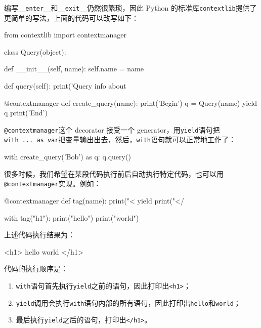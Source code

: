 编写\texttt{\_\_enter\_\_}和\texttt{\_\_exit\_\_}仍然很繁琐，因此 Python
的标准库\texttt{contextlib}提供了更简单的写法，上面的代码可以改写如下：

\begin{pythoncode}
from contextlib import contextmanager

class Query(object):

    def __init__(self, name):
        self.name = name

    def query(self):
        print('Query info about %

@contextmanager
def create_query(name):
    print('Begin')
    q = Query(name)
    yield q
    print('End')
\end{pythoncode}

\texttt{@contextmanager}这个 decorator 接受一个
generator，用\texttt{yield}语句把\texttt{with\ ...\ as\ var}把变量输出出去，然后，\texttt{with}语句就可以正常地工作了：

\begin{pythoncode}
with create_query('Bob') as q:
    q.query()
\end{pythoncode}

很多时候，我们希望在某段代码执行前后自动执行特定代码，也可以用\texttt{@contextmanager}实现。例如：

\begin{pythoncode}
@contextmanager
def tag(name):
    print("<%
    yield
    print("</%

with tag("h1"):
    print("hello")
    print("world")
\end{pythoncode}

上述代码执行结果为：

\begin{pythoncode}
<h1>
hello
world
</h1>
\end{pythoncode}

代码的执行顺序是：

\begin{enumerate}
\def\labelenumi{\arabic{enumi}.}
\item
  \texttt{with}语句首先执行\texttt{yield}之前的语句，因此打印出\texttt{\textless{}h1\textgreater{}}；
\item
  \texttt{yield}调用会执行\texttt{with}语句内部的所有语句，因此打印出\texttt{hello}和\texttt{world}；
\item
  最后执行\texttt{yield}之后的语句，打印出\texttt{\textless{}/h1\textgreater{}}。
\end{enumerate}

